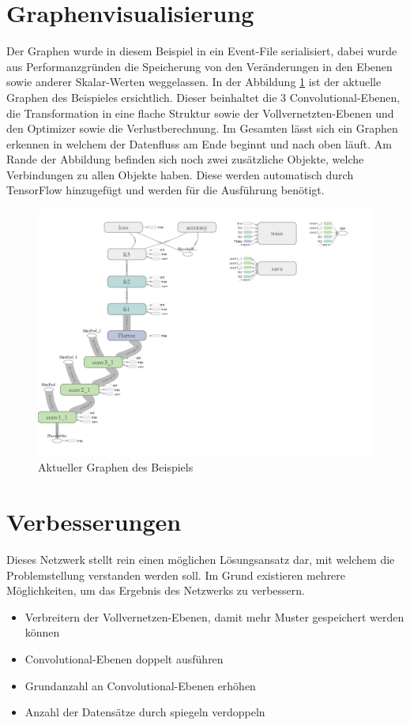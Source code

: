 \section{Graphenvisualisierung}

Der Graphen wurde in diesem Beispiel in ein Event-File serialisiert, dabei wurde aus Performanzgründen die Speicherung von den Veränderungen in den Ebenen sowie anderer Skalar-Werten weggelassen. 
In der Abbildung \ref{fig:graphDig} ist der aktuelle Graphen des Beispieles ersichtlich. 
Dieser beinhaltet die $3$ Convolutional-Ebenen, die Transformation in eine flache Struktur sowie der Vollvernetzten-Ebenen und den Optimizer sowie die Verlustberechnung. 
Im Gesamten lässt sich ein Graphen erkennen in welchem der Datenfluss am Ende beginnt und nach oben läuft. 
Am Rande der Abbildung befinden sich noch zwei zusätzliche Objekte, welche Verbindungen zu allen Objekte haben. 
Diese werden automatisch durch TensorFlow hinzugefügt und werden für die Ausführung benötigt. 
\begin{figure}
	\centering
	\includegraphics[scale=0.25]{images/graph-run.png}
	\caption{Aktueller Graphen des Beispiels}
	\label{fig:graphDig}
\end{figure}

\section{Verbesserungen}

Dieses Netzwerk stellt rein einen möglichen Lösungsansatz dar, mit welchem die Problemstellung verstanden werden soll. 
Im Grund existieren mehrere Möglichkeiten, um das Ergebnis des Netzwerks zu verbessern. 
\begin{itemize}
	\item Verbreitern der Vollvernetzen-Ebenen, damit mehr Muster gespeichert werden können
	\item Convolutional-Ebenen doppelt ausführen 
	\item Grundanzahl an Convolutional-Ebenen erhöhen
	\item Anzahl der Datensätze durch spiegeln verdoppeln
\end{itemize}






